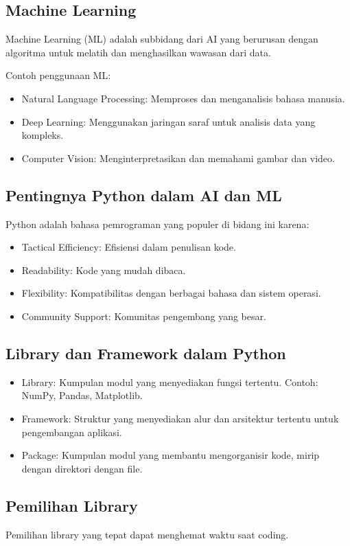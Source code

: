 \documentclass{article}
\begin{document}
\subsection{Machine Learning}
Machine Learning (ML) adalah subbidang dari AI yang berurusan dengan algoritma untuk melatih dan menghasilkan wawasan dari data.

Contoh penggunaan ML:
\begin{itemize}
    \item Natural Language Processing: Memproses dan menganalisis bahasa manusia.
    \item Deep Learning: Menggunakan jaringan saraf untuk analisis data yang kompleks.
    \item Computer Vision: Menginterpretasikan dan memahami gambar dan video.
\end{itemize}

\subsection{Pentingnya Python dalam AI dan ML}
Python adalah bahasa pemrograman yang populer di bidang ini karena:
\begin{itemize}
    \item Tactical Efficiency: Efisiensi dalam penulisan kode.
    \item Readability: Kode yang mudah dibaca.
    \item Flexibility: Kompatibilitas dengan berbagai bahasa dan sistem operasi.
    \item Community Support: Komunitas pengembang yang besar.
\end{itemize}

\subsection{Library dan Framework dalam Python}
\begin{itemize}
    \item Library: Kumpulan modul yang menyediakan fungsi tertentu. Contoh: NumPy, Pandas, Matplotlib.
    \item Framework: Struktur yang menyediakan alur dan arsitektur tertentu untuk pengembangan aplikasi.
    \item Package: Kumpulan modul yang membantu mengorganisir kode, mirip dengan direktori dengan file.
\end{itemize}

\subsection{Pemilihan Library}
Pemilihan library yang tepat dapat menghemat waktu saat coding.
\end{document}
